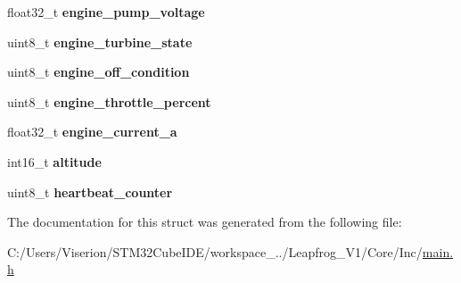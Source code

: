 \begin{DoxyCompactItemize}
float32\+\_\+t {\bfseries engine\+\_\+pump\+\_\+voltage}
\item 
\mbox{\label{struct_s_t_m32_response_a4dfec421f1aa51d1d6d6a598b73d09a1}} 
uint8\+\_\+t {\bfseries engine\+\_\+turbine\+\_\+state}
\item 
\mbox{\label{struct_s_t_m32_response_a5ecc8c671f353b377a9b0b71cde6d382}} 
uint8\+\_\+t {\bfseries engine\+\_\+off\+\_\+condition}
\item 
\mbox{\label{struct_s_t_m32_response_adbbb22f41fd247d7962ff78c2ccca92b}} 
uint8\+\_\+t {\bfseries engine\+\_\+throttle\+\_\+percent}
\item 
\mbox{\label{struct_s_t_m32_response_ad937f627192b480f3b07eb5e6b6d5635}} 
float32\+\_\+t {\bfseries engine\+\_\+current\+\_\+a}
\item 
\mbox{\label{struct_s_t_m32_response_abc14401ab113b00010ee3d2101482f84}} 
int16\+\_\+t {\bfseries altitude}
\item 
\mbox{\label{struct_s_t_m32_response_a67f7cc40c338fc872da36998671c34bc}} 
uint8\+\_\+t {\bfseries heartbeat\+\_\+counter}
\end{DoxyCompactItemize}


The documentation for this struct was generated from the following file\+:\begin{DoxyCompactItemize}
\item 
C\+:/\+Users/\+Viserion/\+S\+T\+M32\+Cube\+I\+D\+E/workspace\+\_../\+Leapfrog\+\_\+\+V1/\+Core/\+Inc/\mbox{\hyperlink{main_8h}{main.\+h}}\end{DoxyCompactItemize}
